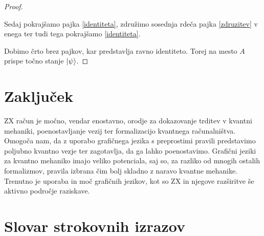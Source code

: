 \documentclass[mat1]{fmfdelo}
\begin{document}
\begin{proof}
\begin{center}
    \end{center}
    Sedaj pokrajšamo pajka \ref{identiteta}, združimo sosednja rdeča pajka \ref{zdruzitev} v enega ter tudi tega pokrajšamo \ref{identiteta}.
    \begin{center}
    \end{center}
    Dobimo črto brez pajkov, kar predstavlja ravno identiteto. Torej na mesto \(A\) prispe točno stanje \(\ket\psi\).
\end{proof}
\section{Zaključek}
ZX račun je močno, vendar enostavno, orodje za dokazovanje trditev v kvantni mehaniki, poenostavljanje vezij ter formalizacijo kvantnega računalništva. Omogoča nam, da z uporabo grafičnega jezika s preprostimi pravili predstavimo poljubno kvantno vezje ter zagotavlja, da ga lahko poenostavimo. Grafični jeziki za kvantno mehaniko imajo veliko potenciala, saj so, za razliko od mnogih ostalih formalizmov, pravila izbrana čim bolj skladno z naravo kvantne mehanike. Trenutno je uporaba in moč grafičnih jezikov, kot so ZX in njegove razširitve še aktivno področje raziskave. 

\section*{Slovar strokovnih izrazov}




\end{document}
